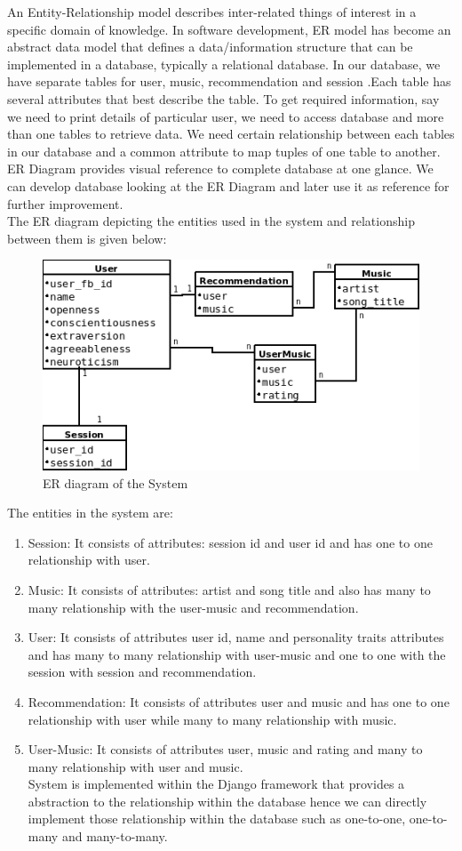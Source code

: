 An Entity-Relationship model describes inter-related things of interest in a specific domain of knowledge. In software development, ER model has become an abstract data model that defines a data/information structure that can be implemented in a database, typically a relational database. In our database, we have separate tables for user, music, recommendation and session .Each table has several attributes that best describe the table. To get required information, say we need to print details of particular user, we need to access database and more than one tables to retrieve data. We need certain relationship between each tables in our database and a common attribute to map tuples of one table to another. ER Diagram provides visual reference to complete database at one glance. We can develop database looking at the ER Diagram and later use it as reference for further improvement. 
\\
The  ER diagram depicting the entities used in the system and relationship between them is given below:
\begin{figure}[!ht]
\centering
\includegraphics[width = 10 cm]{fig/er.png}
\caption{ER diagram of the System}
\label{fig:er}
\end{figure}
The entities in the system are:
\begin{enumerate}
	\item Session: It consists of attributes: session id and user id and has one to one relationship with user.
	\item Music: It consists of attributes: artist and song title and also has  many to many relationship with the user-music and recommendation.
	\item User: It consists of attributes user id, name and personality traits attributes and has  many to  many relationship with user-music and one to one with the session with session and recommendation.
	\item Recommendation: It consists of attributes user and music and has one to one relationship with user while many to many relationship with music.

	\item User-Music: It consists of attributes user, music and rating and many to many relationship with user and music.
\\
System is implemented within the Django framework that provides a abstraction to the relationship within the database hence we can directly implement those relationship within the database such as one-to-one, one-to-many and many-to-many.
\end{enumerate}
